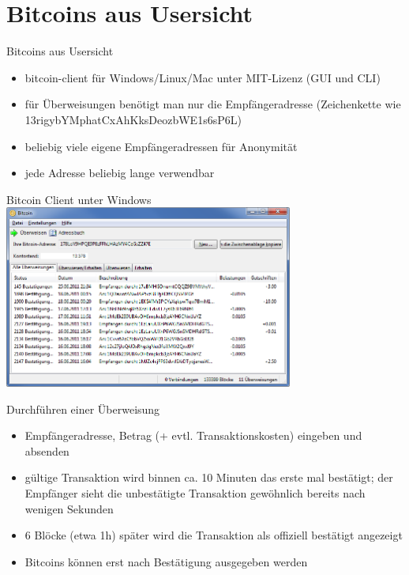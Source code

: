 \documentclass[handout]{beamer} \usepackage[german]{babel}
\begin{document}
\section{Bitcoins aus Usersicht}
\begin{frame}{Bitcoins aus Usersicht}
	\begin{itemize}
		\item bitcoin-client für Windows/Linux/Mac unter MIT-Lizenz (GUI und CLI)
		\item für Überweisungen benötigt man nur die Empfängeradresse
			(Zeichenkette wie 13rigybYMphatCxAhKksDeozbWE1s6sP6L)
		\item beliebig viele eigene Empfängeradressen für Anonymität
		\item jede Adresse beliebig lange verwendbar
	\end{itemize}
\end{frame}


\begin{frame} {Bitcoin Client unter Windows}
\includegraphics[height=60mm]{btcvortrag/BitcoinClientWindows.png}
\end{frame}


\begin{frame}{Durchführen einer Überweisung}
	\begin{itemize}
		\item Empfängeradresse, Betrag (+ evtl. Transaktionskosten)
			eingeben und absenden
		\item gültige Transaktion wird binnen ca. 10 Minuten das erste mal
			bestätigt; der Empfänger sieht die unbestätigte Transaktion gewöhnlich
			bereits nach wenigen Sekunden
		\item 6 Blöcke (etwa 1h) später wird die Transaktion als offiziell bestätigt
			angezeigt
		\item Bitcoins können erst nach Bestätigung ausgegeben werden
	\end{itemize}
\end{frame}
\end{document}
